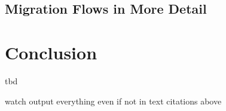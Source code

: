 \documentclass[12pt,letterpaper]{article}
\begin{document}
\subsection{Migration Flows in More Detail}
\clearpage


\section{Conclusion}
tbd

\newpage


watch output everything even if not in text citations above
\end{document}
